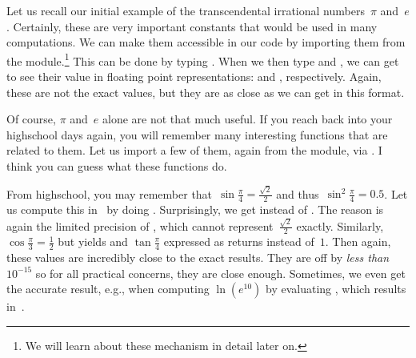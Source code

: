 %
Let us recall our initial example of the transcendental irrational numbers~$\pi$ and~$e$.
Certainly, these are very important constants that would be used in many computations.
We can make them accessible in our code by importing them from the  module.\footnote{%
We will learn about these mechanism in detail later on.}
This can be done by typing .
When we then type  and , we can get to see their value in floating point representations:  and , respectively.
Again, these are not the exact values, but they are as close as we can get in this format.

Of course, $\pi$ and~$e$ alone are not that much useful.
If you reach back into your highschool days again, you will remember many interesting functions that are related to them.
Let us import a few of them, again from the  module, via .
I think you can guess what these functions do.

From highschool, you may remember that~$\sin{\frac{\pi}{4}}=\frac{\sqrt{2}}{2}$ and thus~$\sin^2{\frac{\pi}{4}}=0.5$.
Let us compute this in \python\ by doing .
Surprisingly, we get  instead of .
The reason is again the limited precision of , which cannot represent~$\frac{\sqrt{2}}{2}$ exactly.
Similarly, $\cos{\frac{\pi}{3}}=\frac{1}{2}$ but  yields  and $\tan{\frac{\pi}{4}}$ expressed as  returns  instead of~$1$.
Then again, these values are incredibly close to the exact results.
They are off by \emph{less than~$10^{-15}$} so for all practical concerns, they are close enough.
Sometimes, we even get the accurate result, e.g., when computing $\ln(e^{10})$ by evaluating , which results in~.

